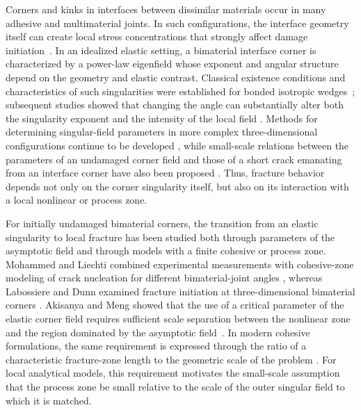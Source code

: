 \documentclass[pdflatex,onecolumn,sn-mathphys-ay]{sn-jnl}
\begin{document}
Corners and kinks in interfaces between dissimilar materials occur in many
adhesive and multimaterial joints. In such configurations, the interface
geometry itself can create local stress concentrations that strongly affect
damage initiation~\citep{GacoinEtAl2009}. In an idealized elastic setting, a
bimaterial interface corner is characterized by a power-law eigenfield whose
exponent and angular structure depend on the geometry and elastic contrast.
Classical existence conditions and characteristics of such singularities were
established for bonded isotropic wedges~\citep{BogyWang1971,DempseySinclair1981};
subsequent studies showed that changing the angle can substantially alter both
the singularity exponent and the intensity of the local field
\citep{MohammedLiechti2001}. Methods for determining singular-field parameters
in more complex three-dimensional configurations continue to be developed
\citep{MiyazakiFukudaNoda2025}, while small-scale relations between the
parameters of an undamaged corner field and those of a short crack emanating
from an interface corner have also been proposed
\citep{LyuZhangMai2026}. Thus, fracture behavior depends not only on the corner singularity itself,
but also on its interaction with a local nonlinear or process zone.

For initially undamaged bimaterial corners, the transition from an elastic
singularity to local fracture has been studied both through parameters of the
asymptotic field and through models with a finite cohesive or process zone.
Mohammed and Liechti combined experimental measurements with cohesive-zone
modeling of crack nucleation for different bimaterial-joint angles
\citeyearpar{MohammedLiechti2000}, whereas Labossiere and Dunn examined fracture
initiation at three-dimensional bimaterial corners
\citeyearpar{LabossiereDunn2001}. Akisanya and Meng showed that the use of a
critical parameter of the elastic corner field requires sufficient scale
separation between the nonlinear zone and the region dominated by the
asymptotic field~\citeyearpar{AkisanyaMeng2003}. In modern cohesive formulations,
the same requirement is expressed through the ratio of a characteristic
fracture-zone length to the geometric scale of the problem
\citep{GormanThouless2022,ThoulessGoutianos2023}. For local analytical models, this requirement motivates the small-scale
assumption that the process zone be small relative to the scale of the outer
singular field to which it is matched.
\end{document}
